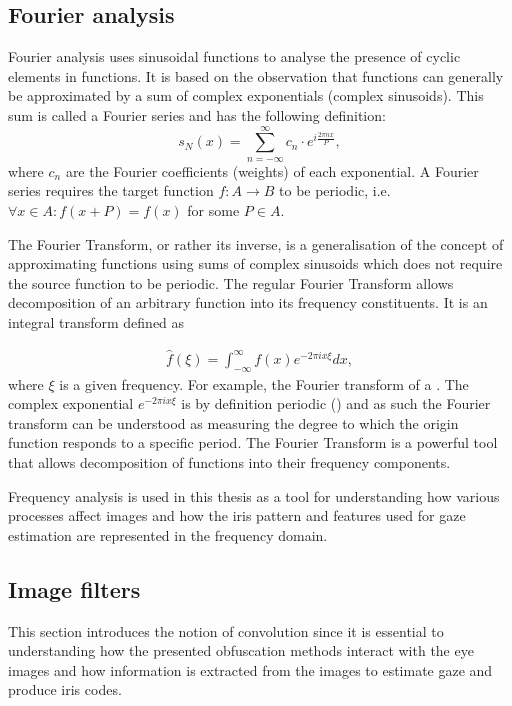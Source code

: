 \subsection{Fourier analysis}
Fourier analysis uses sinusoidal functions to analyse the presence of cyclic elements in functions. It is based on the observation that functions can generally be approximated by a sum of complex exponentials (complex sinusoids). This sum is called a Fourier series and has the following definition:
\begin{equation}
    s_N(x) = \sum_{n=-\infty}^{\infty} c_n \cdot e^{i\frac{2\pi n x}{P}},
\end{equation}
where $c_n$ are the Fourier coefficients (weights) of each exponential. A Fourier series requires the target function $f: A \rightarrow B$ to be periodic, i.e. $\forall x\in A: f(x+P) = f(x)$ for some $P\in A$.

The Fourier Transform, or rather its inverse, is a generalisation of the concept of approximating functions using sums of complex sinusoids which does not require the source function to be periodic. The regular Fourier Transform allows decomposition of an arbitrary function into its frequency constituents. It is an integral transform defined as

\begin{align}\label{eq:conv}
	\hat{f}(\xi) = \int_{-\infty}^{\infty} f(x) e^{-2\pi i x\xi}dx,
\end{align}
where $\xi$ is a given frequency. For example, the Fourier transform of a . The complex exponential $e^{-2\pi i x\xi}$ is by definition periodic () and as such the Fourier transform can be understood as measuring the degree to which the origin function responds to a specific period. The Fourier Transform is a powerful tool that allows decomposition of functions into their frequency components. 

Frequency analysis is used in this thesis as a tool for understanding how various processes affect images and how the iris pattern and features used for gaze estimation are represented in the frequency domain.

\subsection{Image filters}
This section introduces the notion of convolution since it is essential to understanding how the presented obfuscation methods interact with the eye images and how information is extracted from the images to estimate gaze and produce iris codes.

